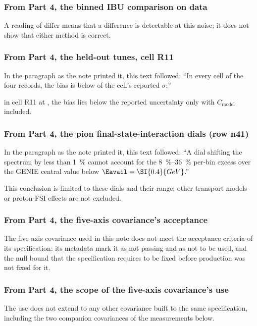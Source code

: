 \subsubsection{From Part 4, the binned IBU comparison on data}
A reading of differ means that a difference is detectable at this noise; it does not show that either method is correct.

\subsubsection{From Part 4, the held-out tunes, cell R11}
In the paragraph as the note printed it, this text followed: ``In every cell of the four records, the bias is below  of the cell's reported $\sigma$;''\par
in cell R11 at , the bias lies below the reported uncertainty only with $C_{\mathrm{model}}$ included.

\subsubsection{From Part 4, the pion final-state-interaction dials (row n41)}
In the paragraph as the note printed it, this text followed: ``A dial shifting the spectrum by less than \SI{1}{\percent} cannot account for the \SIrange{8}{36}{\percent} per-bin excess over the GENIE central value below $\Eavail=\SI{0.4}{GeV}$.''\par
This conclusion is limited to these dials and their range; other transport models or proton-FSI effects are not excluded.

\subsubsection{From Part 4, the five-axis covariance's acceptance}
The five-axis covariance used in this note does not meet the acceptance criteria of its specification: its metadata mark it as not passing and as not to be used, and the null bound that the specification requires to be fixed before production was not fixed for it.

\subsubsection{From Part 4, the scope of the five-axis covariance's use}
The use does not extend to any other covariance built to the same specification, including the two companion covariances of the measurements below.

